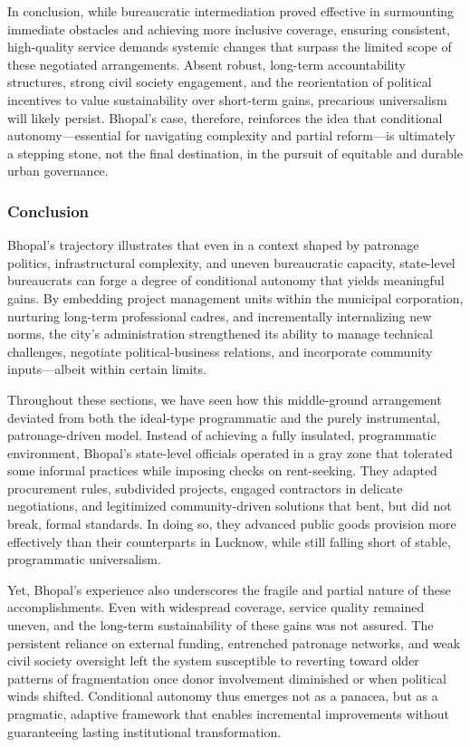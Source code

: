 In conclusion, while bureaucratic intermediation proved effective in surmounting immediate obstacles and achieving more inclusive coverage, ensuring consistent, high-quality service demands systemic changes that surpass the limited scope of these negotiated arrangements. Absent robust, long-term accountability structures, strong civil society engagement, and the reorientation of political incentives to value sustainability over short-term gains, precarious universalism will likely persist. Bhopal’s case, therefore, reinforces the idea that conditional autonomy—essential for navigating complexity and partial reform—is ultimately a stepping stone, not the final destination, in the pursuit of equitable and durable urban governance.

\subsubsection{Conclusion}
Bhopal’s trajectory illustrates that even in a context shaped by patronage politics, infrastructural complexity, and uneven bureaucratic capacity, state-level bureaucrats can forge a degree of conditional autonomy that yields meaningful gains. By embedding project management units within the municipal corporation, nurturing long-term professional cadres, and incrementally internalizing new norms, the city’s administration strengthened its ability to manage technical challenges, negotiate political-business relations, and incorporate community inputs—albeit within certain limits.

Throughout these sections, we have seen how this middle-ground arrangement deviated from both the ideal-type programmatic and the purely instrumental, patronage-driven model. Instead of achieving a fully insulated, programmatic environment, Bhopal’s state-level officials operated in a gray zone that tolerated some informal practices while imposing checks on rent-seeking. They adapted procurement rules, subdivided projects, engaged contractors in delicate negotiations, and legitimized community-driven solutions that bent, but did not break, formal standards. In doing so, they advanced public goods provision more effectively than their counterparts in Lucknow, while still falling short of stable, programmatic universalism.

Yet, Bhopal’s experience also underscores the fragile and partial nature of these accomplishments. Even with widespread coverage, service quality remained uneven, and the long-term sustainability of these gains was not assured. The persistent reliance on external funding, entrenched patronage networks, and weak civil society oversight left the system susceptible to reverting toward older patterns of fragmentation once donor involvement diminished or when political winds shifted. Conditional autonomy thus emerges not as a panacea, but as a pragmatic, adaptive framework that enables incremental improvements without guaranteeing lasting institutional transformation.

